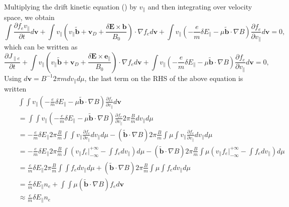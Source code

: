 \documentclass{article}
\newcommand{\nobracket}{}
\begin{document}
Multiplying the drift kinetic equation () by $v_{\parallel}$ and then
integrating over velocity space, we obtain
\begin{equation}
  \int \frac{\partial f_e v_{\parallel}}{\partial t} d\mathbf{v}+ \int
  v_{\parallel} \left( v_{\parallel} \tilde{\mathbf{b}} +\mathbf{v}_D +
  \frac{\delta \mathbf{E} \times \mathbf{b}}{B_0} \right) \cdot \nabla f_e
  d\mathbf{v}+ \int v_{\parallel} \left( - \frac{e}{m} \delta E_{\parallel} -
  \mu \tilde{\mathbf{b}} \cdot \nabla B \right) \frac{\partial f_e}{\partial
  v_{\parallel}} d\mathbf{v}= 0,
\end{equation}
which can be written as
\begin{equation}
  \frac{\partial J_{\parallel e}}{\partial t} + \int v_{\parallel} \left(
  v_{\parallel} \tilde{\mathbf{b}} +\mathbf{v}_D + \frac{\delta \mathbf{E}
  \times \mathbf{e}_{\parallel}}{B_0} \right) \cdot \nabla f_e d\mathbf{v}+
  \int v_{\parallel} \left( - \frac{e}{m} \delta E_{\parallel} - \mu
  \tilde{\mathbf{b}} \cdot \nabla B \right) \frac{\partial f_e}{\partial
  v_{\parallel}} d\mathbf{v}= 0,
\end{equation}
Using $d\mathbf{v}= B^{- 1} 2 \pi m d v_{\parallel} d \mu$, the last term on
the RHS of the above equation is written
\begin{eqnarray}
  &  & \int \int v_{\parallel} \left( - \frac{e}{m} \delta E_{\parallel} -
  \mu \tilde{\mathbf{b}} \cdot \nabla B \right) \frac{\partial f_e}{\partial
  v_{\parallel}} d\mathbf{v} \nonumber\\
  &  & = \int \int v_{\parallel} \left( - \frac{e}{m} \delta E_{\parallel} -
  \mu \tilde{\mathbf{b}} \cdot \nabla B \right) \frac{\partial f_e}{\partial
  v_{\parallel}} 2 \pi \frac{B}{m} d v_{\parallel} d \mu \nonumber\\
  &  & = - \frac{e}{m} \delta E_{\parallel} 2 \pi \frac{B}{m} \int \int
  v_{\parallel} \frac{\partial f_e}{\partial v_{\parallel}} d v_{\parallel} d
  \mu - (\tilde{\mathbf{b}} \cdot \nabla B) 2 \pi \frac{B}{m} \int \mu \int
  v_{\parallel} \frac{\partial f_e}{\partial v_{\parallel}} d v_{\parallel} d
  \mu \nonumber\\
  &  & = - \frac{e}{m} \delta E_{\parallel} 2 \pi \frac{B}{m} \int \left(
  v_{\parallel} f_e |_{- \infty}^{+ \infty} \nobracket - \int f_e d
  v_{\parallel} \right) d \mu - (\tilde{\mathbf{b}} \cdot \nabla B) 2 \pi
  \frac{B}{m} \int \mu \left( v_{\parallel} f_e |_{- \infty}^{+ \infty}
  \nobracket - \int f_e d v_{\parallel} \right) d \mu \nonumber\\
  &  & = \frac{e}{m} \delta E_{\parallel} 2 \pi \frac{B}{m} \int \int f_e d
  v_{\parallel} d \mu + (\tilde{\mathbf{b}} \cdot \nabla B) 2 \pi \frac{B}{m}
  \int \mu \int f_e d v_{\parallel} d \mu \nonumber\\
  &  & = \frac{e}{m} \delta E_{\parallel} n_e + \int \int \mu
  (\tilde{\mathbf{b}} \cdot \nabla B) f_e d\mathbf{v} \\
  &  & \approx \frac{e}{m} \delta E_{\parallel} n_e \nonumber
\end{eqnarray}
\end{document}
